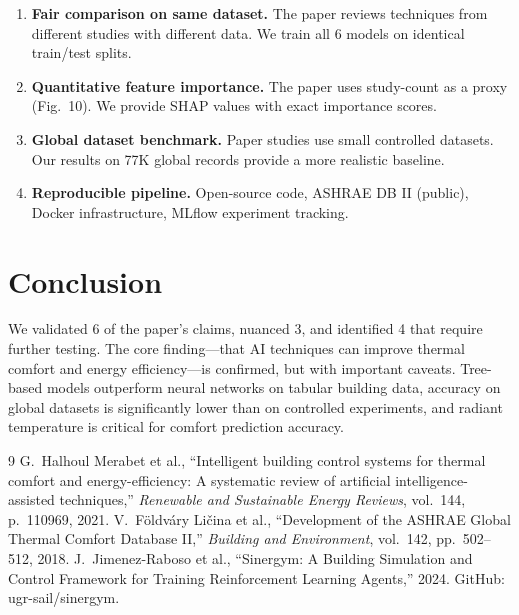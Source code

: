 \documentclass[11pt,a4paper]{article}
\begin{document}
\begin{enumerate}
    \item \textbf{Fair comparison on same dataset.} The paper reviews techniques from different studies with different data. We train all 6 models on identical train/test splits.

    \item \textbf{Quantitative feature importance.} The paper uses study-count as a proxy (Fig.\ 10). We provide SHAP values with exact importance scores.

    \item \textbf{Global dataset benchmark.} Paper studies use small controlled datasets. Our results on 77K global records provide a more realistic baseline.

    \item \textbf{Reproducible pipeline.} Open-source code, ASHRAE DB II (public), Docker infrastructure, MLflow experiment tracking.
\end{enumerate}

\section{Conclusion}

We validated 6 of the paper's claims, nuanced 3, and identified 4 that require further testing. The core finding---that AI techniques can improve thermal comfort and energy efficiency---is confirmed, but with important caveats. Tree-based models outperform neural networks on tabular building data, accuracy on global datasets is significantly lower than on controlled experiments, and radiant temperature is critical for comfort prediction accuracy.

\begin{thebibliography}{9}
 G.\ Halhoul Merabet et al., ``Intelligent building control systems for thermal comfort and energy-efficiency: A systematic review of artificial intelligence-assisted techniques,'' \textit{Renewable and Sustainable Energy Reviews}, vol.\ 144, p.\ 110969, 2021.
 V.\ F\"{o}ldv\'{a}ry Li\v{c}ina et al., ``Development of the ASHRAE Global Thermal Comfort Database II,'' \textit{Building and Environment}, vol.\ 142, pp.\ 502--512, 2018.
 J.\ Jimenez-Raboso et al., ``Sinergym: A Building Simulation and Control Framework for Training Reinforcement Learning Agents,'' 2024. GitHub: ugr-sail/sinergym.
\end{thebibliography}
\end{document}
